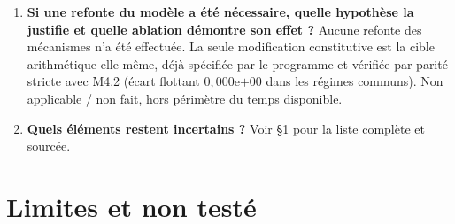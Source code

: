 \documentclass[11pt,a4paper]{article}
\begin{document}
\begin{enumerate}
\item \textbf{Si une refonte du modèle a été nécessaire, quelle
  hypothèse la justifie et quelle ablation démontre son effet ?} Aucune
  refonte des mécanismes n'a été effectuée. La seule modification
  constitutive est la cible arithmétique elle-même, déjà spécifiée par
  le programme et vérifiée par parité stricte avec M4.2 (écart flottant
  $0{,}000\mathrm{e}{+00}$ dans les régimes communs). Non applicable /
  non fait, hors périmètre du temps disponible.

\item \textbf{Quels éléments restent incertains ?} Voir
  \S\ref{sec:limites} pour la liste complète et sourcée.
\end{enumerate}

\section{Limites et non testé}
\label{sec:limites}
\end{document}
